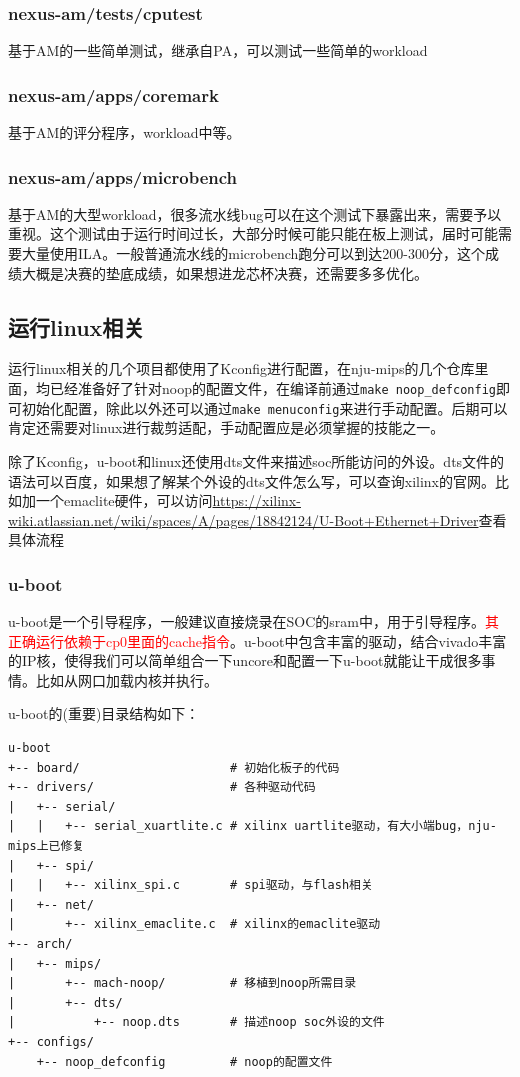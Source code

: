 \documentclass[lang=cn,11pt,a4paper]{elegantpaper}
\begin{document}
\subsubsection{nexus-am/tests/cputest}
基于AM的一些简单测试，继承自PA，可以测试一些简单的workload
\subsubsection{nexus-am/apps/coremark}
基于AM的评分程序，workload中等。
\subsubsection{nexus-am/apps/microbench}
基于AM的大型workload，很多流水线bug可以在这个测试下暴露出来，需要予以重视。这个测试由于运行时间过长，大部分时候可能只能在板上测试，届时可能需要大量使用ILA。一般普通流水线的microbench跑分可以到达200-300分，这个成绩大概是决赛的垫底成绩，如果想进龙芯杯决赛，还需要多多优化。

\subsection{运行linux相关}

运行linux相关的几个项目都使用了Kconfig进行配置，在nju-mips的几个仓库里面，均已经准备好了针对noop的配置文件，在编译前通过\lstinline!make noop_defconfig!即可初始化配置，除此以外还可以通过\lstinline!make menuconfig!来进行手动配置。后期可以肯定还需要对linux进行裁剪适配，手动配置应是必须掌握的技能之一。

除了Kconfig，u-boot和linux还使用dts文件来描述soc所能访问的外设。dts文件的语法可以百度，如果想了解某个外设的dts文件怎么写，可以查询xilinx的官网。比如加一个emaclite硬件，可以访问\url{https://xilinx-wiki.atlassian.net/wiki/spaces/A/pages/18842124/U-Boot+Ethernet+Driver}查看具体流程

\subsubsection{u-boot}

u-boot是一个引导程序，一般建议直接烧录在SOC的sram中，用于引导程序。\textcolor{red}{其正确运行依赖于cp0里面的cache指令}。u-boot中包含丰富的驱动，结合vivado丰富的IP核，使得我们可以简单组合一下uncore和配置一下u-boot就能让干成很多事情。比如从网口加载内核并执行。

u-boot的(重要)目录结构如下：
\begin{lstlisting}
u-boot
+-- board/                     # 初始化板子的代码
+-- drivers/                   # 各种驱动代码
|   +-- serial/
|   |   +-- serial_xuartlite.c # xilinx uartlite驱动，有大小端bug，nju-mips上已修复
|   +-- spi/
|   |   +-- xilinx_spi.c       # spi驱动，与flash相关
|   +-- net/
|       +-- xilinx_emaclite.c  # xilinx的emaclite驱动
+-- arch/
|   +-- mips/
|       +-- mach-noop/         # 移植到noop所需目录
|       +-- dts/
|           +-- noop.dts       # 描述noop soc外设的文件
+-- configs/
    +-- noop_defconfig         # noop的配置文件
\end{lstlisting}
\end{document}
